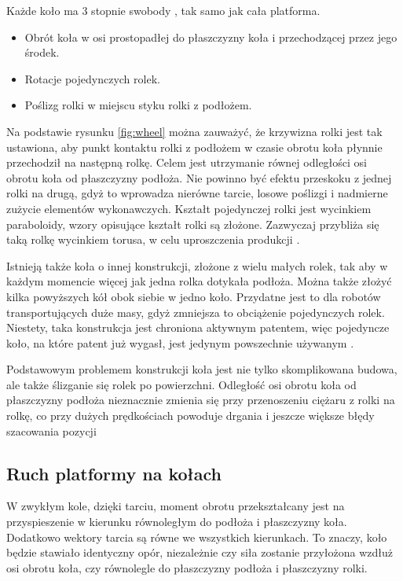 	Każde koło ma 3 stopnie swobody \cite{kinematic_modeling}, tak samo jak cała platforma.
	\begin{itemize}
		\item Obrót koła w osi prostopadłej do płaszczyzny koła i przechodzącej przez jego środek.
		\item Rotacje pojedynczych rolek.
		\item Poślizg rolki w miejscu styku rolki z podłożem.
	\end{itemize}

	Na podstawie rysunku \ref{fig:wheel} można zauważyć, że krzywizna rolki jest tak ustawiona, aby punkt kontaktu rolki z podłożem w czasie obrotu koła płynnie przechodził na następną rolkę.
	Celem jest utrzymanie równej odległości osi obrotu koła od płaszczyzny podłoża.
	Nie powinno być efektu przeskoku z jednej rolki na drugą, gdyż to wprowadza nierówne tarcie, losowe poślizgi i nadmierne zużycie elementów wykonawczych.
	Kształt pojedynczej rolki jest wycinkiem paraboloidy, wzory opisujące kształt rolki są złożone.
	Zazwyczaj przybliża się taką rolkę wycinkiem torusa, w celu uproszczenia produkcji \cite{rollers}.

	Istnieją także koła o innej konstrukcji, złożone z wielu małych rolek, tak aby w każdym momencie więcej jak jedna rolka dotykała podłoża.
	Można także złożyć kilka powyższych kół obok siebie w jedno koło.
	Przydatne jest to dla robotów transportujących duże masy, gdyż zmniejsza to obciążenie pojedynczych rolek.
	Niestety, taka konstrukcja jest chroniona aktywnym patentem, więc pojedyncze koło, na które patent już wygasł, jest jedynym powszechnie używanym \cite{paletobot}.

	Podstawowym problemem konstrukcji koła jest nie tylko skomplikowana budowa, ale także ślizganie się rolek po powierzchni.
	Odległość osi obrotu koła od płaszczyzny podłoża nieznacznie zmienia się przy przenoszeniu ciężaru z rolki na rolkę, co przy dużych prędkościach powoduje drgania i jeszcze większe błędy szacowania pozycji

	\subsection{Ruch platformy na kołach}
		\label{sec:robot_movement}
		W zwykłym kole, dzięki tarciu, moment obrotu przekształcany jest na przyspieszenie w kierunku równoległym do podłoża i płaszczyzny koła.
		Dodatkowo wektory tarcia są równe we wszystkich kierunkach. To znaczy, koło będzie stawiało identyczny opór, niezależnie czy siła
		zostanie przyłożona wzdłuż osi obrotu koła, czy równolegle do płaszczyzny podłoża i płaszczyzny rolki.
		
